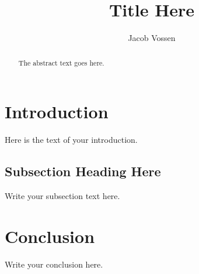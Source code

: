 \documentclass{article}
\begin{document}
\title{Title Here}
\author{Jacob Vossen}
\maketitle
\begin{abstract}
The abstract text goes here.
\end{abstract}
\section{Introduction}
Here is the text of your introduction.
\subsection{Subsection Heading Here}
Write your subsection text here.
\section{Conclusion}
Write your conclusion here.
\end{document}
